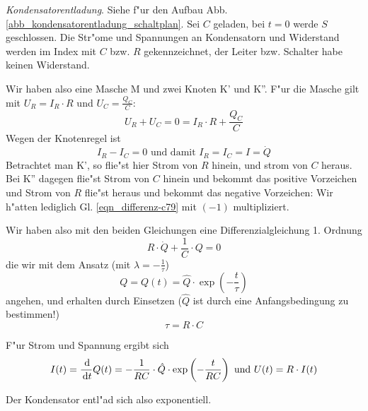 \begin{Beispiel}
   \emph{Kondensatorentladung}. Siehe f"ur
   den Aufbau Abb. \ref{abb_kondensatorentladung_schaltplan}. Sei $C$
   geladen, bei $t = 0$ werde $S$ geschlossen. Die Str"ome und
   Spannungen an Kondensatorn und Widerstand werden im Index mit $C$
   bzw. $R$ gekennzeichnet, der Leiter bzw. Schalter habe keinen
   Widerstand.

Wir haben also eine Masche  M und zwei Knoten K' und K''. F"ur die
Masche gilt mit $U_R = I_R \cdot R$ und $U_C = \frac{Q_C}{C}$:
\begin{equation}
   \label{eqn_differenz-c78}
   U_R + U_C = 0 = I_R \cdot R + \frac{Q_C}{C}
\end{equation}
Wegen der Knotenregel ist
\begin{equation}
   \label{eqn_differenz-c79}
   I_R - I_C = 0 \text{ und damit } I_R = I_C = I = \dot Q
\end{equation}
Betrachtet man K', so flie"st hier Strom von $R$ hinein, und strom von
$C$ heraus. Bei K'' dagegen flie"st Strom von $C$ hinein und bekommt
das positive Vorzeichen und Strom von $R$ flie"st heraus und bekommt
das negative Vorzeichen: Wir h"atten lediglich
Gl. \eqref{eqn_differenz-c79} mit $(-1)$ multipliziert.

Wir haben also mit den beiden Gleichungen eine Differenzialgleichung
1. Ordnung
\begin{equation}
   \label{eqn_differenz-c80}
   R \cdot \dot Q + \frac{1}{C} \cdot Q = 0
\end{equation}
die wir mit dem Ansatz (mit $\lambda = -\frac{1}{\tau}$)
\begin{equation*}
   Q = Q(t) = \hat Q \cdot \exp \left ( - \frac{t}{\tau} \right )
\end{equation*}
angehen, und erhalten durch Einsetzen ($\hat Q$ ist durch eine
Anfangsbedingung zu bestimmen!)
\begin{equation*}
   \tau = R \cdot C
\end{equation*}

F"ur Strom und Spannung ergibt sich
\begin{equation*}
   I(t) = \frac{\, \mathrm{d} }{\, \mathrm{d} t} Q(t) = - \frac{1}{R C} \cdot  \hat Q
   \cdot \exp \left ( - \frac{t}{RC} \right ) \text{ und } U(t) = R
   \cdot I(t)
\end{equation*}

Der Kondensator entl"ad sich also exponentiell.
\end{Beispiel}





